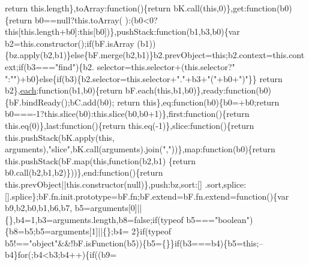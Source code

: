 \begin{DoxyCode}
{      return} this.length\},toArray:\textcolor{keyword}{function}()\{\textcolor{keywordflow}{return} bK.call(\textcolor{keyword}{this},0)\},\textcolor{keyword}{get}:\textcolor{keyword}{function}(b0)\{\textcolor{keywordflow}{return} b0==null?this.toArray(
      ):(b0<0?\textcolor{keyword}{this}[this.length+b0]:\textcolor{keyword}{this}[b0])\},pushStack:\textcolor{keyword}{function}(b1,b3,b0)\{var b2=this.constructor();\textcolor{keywordflow}{if}(bF.isArray
      (b1))\{bz.apply(b2,b1)\}\textcolor{keywordflow}{else}\{bF.merge(b2,b1)\}b2.prevObject=\textcolor{keyword}{this};b2.context=this.context;\textcolor{keywordflow}{if}(b3===\textcolor{stringliteral}{"find"})\{b2.
      selector=this.selector+(this.selector?\textcolor{stringliteral}{" "}:\textcolor{stringliteral}{""})+b0\}\textcolor{keywordflow}{else}\{\textcolor{keywordflow}{if}(b3)\{b2.selector=this.selector+\textcolor{stringliteral}{"."}+b3+\textcolor{stringliteral}{"("}+b0+\textcolor{stringliteral}{")"}\}\}\textcolor{keywordflow}{
      return} b2\},\hyperlink{jquery_8js_a871ff39db627c54c710a3e9909b8234c}{each}:\textcolor{keyword}{function}(b1,b0)\{\textcolor{keywordflow}{return} bF.each(\textcolor{keyword}{this},b1,b0)\},ready:\textcolor{keyword}{function}(b0)\{bF.bindReady();bC.add(b0);\textcolor{keywordflow}{
      return} \textcolor{keyword}{this}\},eq:\textcolor{keyword}{function}(b0)\{b0=+b0;\textcolor{keywordflow}{return} b0===-1?this.slice(b0):this.slice(b0,b0+1)\},first:\textcolor{keyword}{function}()\{\textcolor{keywordflow}{return} 
      this.eq(0)\},last:\textcolor{keyword}{function}()\{\textcolor{keywordflow}{return} this.eq(-1)\},slice:\textcolor{keyword}{function}()\{\textcolor{keywordflow}{return} this.pushStack(bK.apply(\textcolor{keyword}{this},
      arguments),\textcolor{stringliteral}{"slice"},bK.call(arguments).join(\textcolor{stringliteral}{","}))\},map:\textcolor{keyword}{function}(b0)\{\textcolor{keywordflow}{return} this.pushStack(bF.map(\textcolor{keyword}{this},\textcolor{keyword}{function}(b2,b1)
      \{return b0.call(b2,b1,b2)\}))\},end:\textcolor{keyword}{function}()\{\textcolor{keywordflow}{return} this.prevObject||this.constructor(null)\},push:bz,sort:[]
      .sort,splice:[].splice\};bF.fn.init.prototype=bF.fn;bF.extend=bF.fn.extend=\textcolor{keyword}{function}()\{var b9,b2,b0,b1,b6,b7,
      b5=arguments[0]||\{\},b4=1,b3=arguments.length,b8=\textcolor{keyword}{false};\textcolor{keywordflow}{if}(typeof b5===\textcolor{stringliteral}{"boolean"})\{b8=b5;b5=arguments[1]||\{\};b4=
      2\}\textcolor{keywordflow}{if}(typeof b5!==\textcolor{stringliteral}{"object"}&&!bF.isFunction(b5))\{b5=\{\}\}\textcolor{keywordflow}{if}(b3===b4)\{b5=\textcolor{keyword}{this};--b4\}\textcolor{keywordflow}{for}(;b4<b3;b4++)\{\textcolor{keywordflow}{if}((b9=

\end{DoxyCode}

